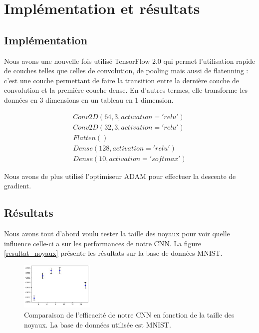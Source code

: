 \section{Implémentation et résultats}

\subsection{Implémentation}

Nous avons une nouvelle fois utilisé TensorFlow 2.0 qui permet l'utilisation rapide de couches telles que celles de convolution, de pooling mais aussi de flatenning : c'est une couche permettant de faire la transition entre la dernière couche de convolution et la première couche dense. En d'autres termes, elle transforme les données en 3 dimensions en un tableau en 1 dimension.

\[ \begin{array}{lcr}
	Conv2D(64, 3, activation='relu') \\
    Conv2D(32, 3, activation='relu') \\
    Flatten() \\
    Dense(128, activation='relu') \\
    Dense(10, activation='softmax')\end{array}\]

Nous avons de plus utilisé l'optimiseur ADAM pour effectuer la descente de gradient.

\subsection{Résultats}

Nous avons tout d'abord voulu tester la taille des noyaux pour voir quelle influence celle-ci a sur les performances de notre CNN. La figure \ref{resultat_noyaux} présente les résultats sur la base de données MNIST.

\begin{figure}[!h]
\centering
\includegraphics[width=100pt]{images/cnn/resultat_noyau.png}
\caption{Comparaison de l'efficacité de notre CNN en fonction de la taille des noyaux. La base de données utilisée est MNIST.}
\label{resultat_padding_stride}
\end{figure}

